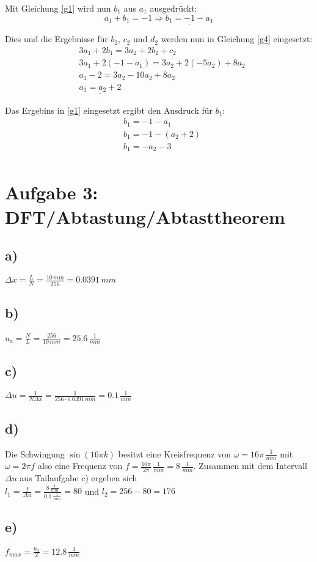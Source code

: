 \documentclass[a4paper,11pt,oneside]{scrartcl}
\begin{document}
Mit Gleichung \eqref{g1} wird nun $b_1$ aus $a_1$ ausgedrückt:
\begin{equation*}a_1 + b_1 = -1 \Rightarrow \underline{b_1 = -1 -a_1}\end{equation*}

Dies und die Ergebnisse für $b_2$, $c_2$ und $d_2$ werden nun in Gleichung \eqref{g4} eingesetzt:
\begin{align*}
&3a_1 + 2b_1 = 3a_2 + 2b_2 + c_2\\
&3a_1 + 2(-1 -a_1) = 3a_2 + 2(-5a_2) + 8a_2\\
&a_1 -2 = 3a_2 - 10a_2 + 8a_2\\
&\underline{a_1 = a_2 + 2}
\end{align*}

Das Ergebins in \eqref{g1} eingesetzt ergibt den Ausdruck für $b_1$:
\begin{align*}
&b_1 = -1 - a_1\\
&b_1 = -1 - (a_2 + 2)\\
&b_1 = -a_2 - 3\\
\end{align*}
\newpage

\section*{Aufgabe 3: DFT/Abtastung/Abtasttheorem}
\subsection*{a)}

$\Delta x=\frac{L}{N}=\frac{10\,mm}{256}=0.0391\,mm$

\subsection*{b)}

$u_{a}=\frac{N}{L}=\frac{256}{10\,mm}=25.6\,\frac{1}{mm}$

\subsection*{c)}

$\Delta u=\frac{1}{N\Delta x}=\frac{1}{256\cdot0.0391\,mm}= 0.1\,\frac{1}{mm}$

\subsection*{d)}

Die Schwingung $\sin(16\pi k)$ besitzt eine Kreisfrequenz von $\omega=16\pi\,\frac{1}{mm}$ mit $\omega=2\pi f$ also eine Frequenz von $f=\frac{16\pi}{2\pi}\,\frac{1}{mm}=8\,\frac{1}{mm}$. Zusammen mit dem Intervall $\Delta u$ aus Tailaufgabe c) ergeben sich \\

$l_{1}=\frac{f}{\Delta u}=\frac{8\,\frac{1}{mm}}{0.1\,\frac{1}{mm}}=80$ und $l_{2}=256-80=176$

\subsection*{e)}

$f_{max}=\frac{u_{a}}{2}=12.8\,\frac{1}{mm}$
\end{document}
